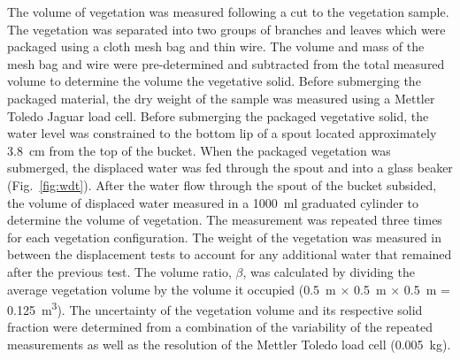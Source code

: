 \documentclass[12pt]{article}
\begin{document}
The volume of vegetation was measured following a cut to the vegetation sample. The vegetation was separated into two groups of branches and leaves which were packaged using a cloth mesh bag and thin wire. The volume and mass of the mesh bag and wire were pre-determined and subtracted from the total measured volume to determine the volume the vegetative solid. Before submerging the packaged material, the dry weight of the sample was measured using a Mettler Toledo Jaguar load cell. Before submerging the packaged vegetative solid, the water level was constrained to the bottom lip of a spout located approximately 3.8~\si{cm} from the top of the bucket. When the packaged vegetation was submerged, the displaced water was fed through the spout and into a glass beaker (Fig.~\ref{fig:wdt}). After the water flow through the spout of the bucket subsided, the volume of displaced water measured in a 1000~ml graduated cylinder to determine the volume of vegetation. The measurement was repeated three times for each vegetation configuration. The weight of the vegetation was measured in between the displacement tests to account for any additional water that remained after the previous test. The volume ratio, $\beta$, was calculated by dividing the average vegetation volume by the volume it occupied (0.5~\si{m} $\times$ 0.5~\si{m} $\times$ 0.5~\si{m} = 0.125~\si{m^{3}}). The uncertainty of the vegetation volume and its respective solid fraction were determined from a combination of the variability of the repeated measurements as well as the resolution of the Mettler Toledo load cell (0.005~\si{kg}).
\end{document}
